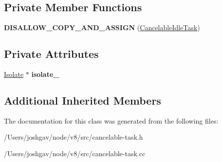 \subsection*{Private Member Functions}
\begin{DoxyCompactItemize}
\item 
{\bfseries D\+I\+S\+A\+L\+L\+O\+W\+\_\+\+C\+O\+P\+Y\+\_\+\+A\+N\+D\+\_\+\+A\+S\+S\+I\+GN} (\hyperlink{classv8_1_1internal_1_1_cancelable_idle_task}{Cancelable\+Idle\+Task})\hypertarget{classv8_1_1internal_1_1_cancelable_idle_task_a6147810f34a28cb23a42cb552f96c8cb}{}\label{classv8_1_1internal_1_1_cancelable_idle_task_a6147810f34a28cb23a42cb552f96c8cb}

\end{DoxyCompactItemize}
\subsection*{Private Attributes}
\begin{DoxyCompactItemize}
\item 
\hyperlink{classv8_1_1internal_1_1_isolate}{Isolate} $\ast$ {\bfseries isolate\+\_\+}\hypertarget{classv8_1_1internal_1_1_cancelable_idle_task_a53d71356f561f18de6f02018ab09ee24}{}\label{classv8_1_1internal_1_1_cancelable_idle_task_a53d71356f561f18de6f02018ab09ee24}

\end{DoxyCompactItemize}
\subsection*{Additional Inherited Members}


The documentation for this class was generated from the following files\+:\begin{DoxyCompactItemize}
\item 
/\+Users/joshgav/node/v8/src/cancelable-\/task.\+h\item 
/\+Users/joshgav/node/v8/src/cancelable-\/task.\+cc\end{DoxyCompactItemize}
